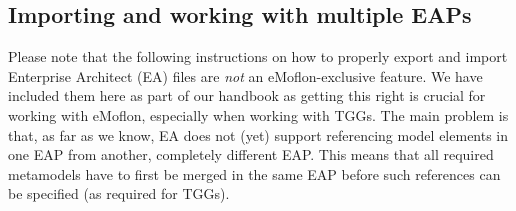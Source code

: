 \newpage
\hypertarget{multiEAP}{}
\subsection{Importing and working with multiple EAPs}
\visHeader

Please note that the following instructions on how to properly export and import Enterprise Architect (EA) files are \emph{not} an eMoflon-exclusive feature.
We have included them here as part of our handbook as getting this right is crucial for working with eMoflon, especially when working with TGGs. The main
problem is that, as far as we know, EA does not (yet) support referencing model elements in one EAP from another, completely different EAP. This means that all
required metamodels have to first be merged in the same EAP before such references can be specified (as required for TGGs).

